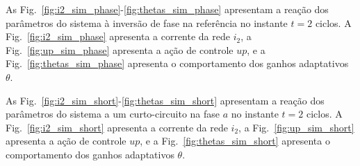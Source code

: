   \vfill
  \noindent
  \begin{minipage}{\textwidth}
    \makebox[\textwidth]{
      \centering
      \def\svgwidth{\textwidth}
      }
    \label{fig:thetas_sim_step}
  \end{minipage}
  \vfill

  \newpage

  As Fig.~\ref{fig:i2_sim_phase}-\ref{fig:thetas_sim_phase} apresentam a reação dos parâmetros do sistema à inversão de fase na referência no instante $t=2$ ciclos. A Fig.~\ref{fig:i2_sim_phase} apresenta a corrente da rede $i_2$, a Fig.~\ref{fig:up_sim_phase} apresenta a ação de controle $up$, e a Fig.~\ref{fig:thetas_sim_phase} apresenta o comportamento dos ganhos adaptativos $\theta$.

  \vfill
  \noindent
  \begin{minipage}{\textwidth}
    \makebox[\textwidth]{
      \centering
      \def\svgwidth{\textwidth}
      }
    \label{fig:i2_sim_phase}
  \end{minipage}
  \vfill

  \newpage

  \vfill
  \noindent
  \begin{minipage}{\textwidth}
    \makebox[\textwidth]{
      \centering
      \def\svgwidth{\textwidth}
      }
    \label{fig:up_sim_phase}
  \end{minipage}

  \vfill
  \noindent
  \begin{minipage}{\textwidth}
    \makebox[\textwidth]{
      \centering
      \def\svgwidth{\textwidth}
      }
    \label{fig:thetas_sim_phase}
  \end{minipage}
  \vfill

  \newpage

  As Fig.~\ref{fig:i2_sim_short}-\ref{fig:thetas_sim_short} apresentam a reação dos parâmetros do sistema a um curto-circuito na fase $a$ no instante $t=2$ ciclos. A Fig.~\ref{fig:i2_sim_short} apresenta a corrente da rede $i_2$, a Fig.~\ref{fig:up_sim_short} apresenta a ação de controle $up$, e a Fig.~\ref{fig:thetas_sim_short} apresenta o comportamento dos ganhos adaptativos $\theta$.

